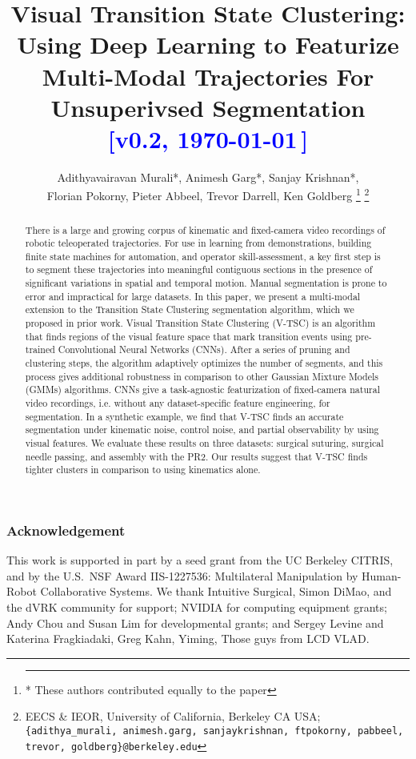 \documentclass[letterpaper, 10 pt, conference]{ieeeconf}
\title{\LARGE \bf
Visual Transition State Clustering: Using Deep Learning to Featurize Multi-Modal Trajectories For Unsuperivsed Segmentation \\
{\textcolor{blue}{[v0.2, \today\,\currenttime]}} }
\author{%
Adithyavairavan Murali*, Animesh Garg*, Sanjay Krishnan*,\\ Florian Pokorny,
Pieter Abbeel, Trevor Darrell, Ken Goldberg 
\thanks{\hrule \vspace{5pt} * These authors contributed equally to the paper}%
\thanks{EECS \& IEOR, University of California, Berkeley CA USA; \texttt{\{adithya\_murali, animesh.garg, sanjaykrishnan, ftpokorny, pabbeel, trevor, goldberg\}@berkeley.edu}}%
}
\newcommand{\tsc}{V-TSC\xspace}
\begin{document}
\maketitle

\begin{abstract}
There is a large and growing corpus of kinematic and fixed-camera video recordings of robotic teleoperated trajectories.
For use in learning from demonstrations, building finite state machines for automation, and operator skill-assessment, a key first step is to segment these trajectories into meaningful contiguous sections in the presence of significant variations in spatial and temporal motion.  
Manual segmentation is prone to error and impractical for large datasets.  
In this paper, we present a multi-modal extension to the Transition State Clustering segmentation algorithm, which we proposed in prior work. 
Visual Transition State Clustering (\tsc) is an algorithm that finds regions of the visual feature space that mark transition events using pre-trained Convolutional Neural Networks (CNNs).
After a series of pruning and clustering steps, the algorithm adaptively optimizes the number of segments, and this process gives additional robustness in comparison to other Gaussian Mixture Models (GMMs) algorithms.
CNNs give a task-agnostic featurization of  fixed-camera natural video recordings, i.e. without any dataset-specific feature engineering, for segmentation.
In a synthetic example, we find that \tsc finds an accurate segmentation under kinematic noise, control noise, and partial observability by using visual features. 
We evaluate these results on three datasets: surgical suturing, surgical needle passing, and assembly with the PR2.
Our results suggest that \tsc finds  tighter clusters in comparison to using kinematics alone.
\end{abstract} 

\fontsize{10pt}{11.5pt}
\selectfont









\subsubsection*{Acknowledgement}
This work is supported in part by a seed grant from the UC Berkeley CITRIS, and by the U.S.\ NSF Award IIS-1227536: Multilateral Manipulation by Human-Robot Collaborative Systems. We thank Intuitive Surgical, Simon DiMao, and the dVRK community for support; NVIDIA for computing equipment grants; Andy Chou and Susan Lim for developmental grants; and Sergey Levine and Katerina Fragkiadaki, Greg Kahn, Yiming, Those guys from LCD VLAD.



\end{document}
